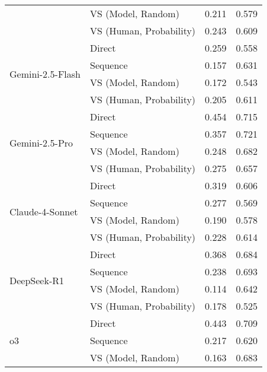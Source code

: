\begin{table}[!htbp]
{\begin{tabular}{llcc}
& VS (Model, Random) & \cellcolor{LightSkyBlue!99}0.211 & \cellcolor{LightSkyBlue!100}0.579 \\
& VS (Human, Probability) & \cellcolor{LightSkyBlue!80}0.243 & \cellcolor{LightSkyBlue!11}0.609 \\
\midrule
\multirow{4}{*}{Gemini-2.5-Flash}
& Direct & 0.259 & 0.558 \\
& Sequence & \cellcolor{LightSkyBlue!100}0.157 & \cellcolor{pink!100}0.631 \\
& VS (Model, Random) & \cellcolor{LightSkyBlue!84}0.172 & \cellcolor{LightSkyBlue!100}0.543 \\
& VS (Human, Probability) & \cellcolor{LightSkyBlue!52}0.205 & \cellcolor{pink!73}0.611 \\
\midrule
\multirow{4}{*}{Gemini-2.5-Pro}
& Direct & 0.454 & 0.715 \\
& Sequence & \cellcolor{LightSkyBlue!47}0.357 & \cellcolor{pink!100}0.721 \\
& VS (Model, Random) & \cellcolor{LightSkyBlue!100}0.248 & \cellcolor{LightSkyBlue!56}0.682 \\
& VS (Human, Probability) & \cellcolor{LightSkyBlue!86}0.275 & \cellcolor{LightSkyBlue!99}0.657 \\
\midrule
\multirow{4}{*}{Claude-4-Sonnet}
& Direct & 0.319 & 0.606 \\
& Sequence & \cellcolor{LightSkyBlue!32}0.277 & \cellcolor{LightSkyBlue!100}0.569 \\
& VS (Model, Random) & \cellcolor{LightSkyBlue!100}0.190 & \cellcolor{LightSkyBlue!75}0.578 \\
& VS (Human, Probability) & \cellcolor{LightSkyBlue!70}0.228 & \cellcolor{pink!100}0.614 \\
\midrule
\multirow{4}{*}{DeepSeek-R1}
& Direct & 0.368 & 0.684 \\
& Sequence & \cellcolor{LightSkyBlue!51}0.238 & \cellcolor{pink!100}0.693 \\
& VS (Model, Random) & \cellcolor{LightSkyBlue!100}0.114 & \cellcolor{LightSkyBlue!26}0.642 \\
& VS (Human, Probability) & \cellcolor{LightSkyBlue!74}0.178 & \cellcolor{LightSkyBlue!100}0.525 \\
\midrule
\multirow{4}{*}{o3} 
& Direct & 0.443 & 0.709 \\
& Sequence & \cellcolor{LightSkyBlue!80}0.217 & \cellcolor{LightSkyBlue!100}0.620 \\
& VS (Model, Random) & \cellcolor{LightSkyBlue!100}0.163 & \cellcolor{LightSkyBlue!29}0.683 \\

\end{tabular}}
\end{table}
